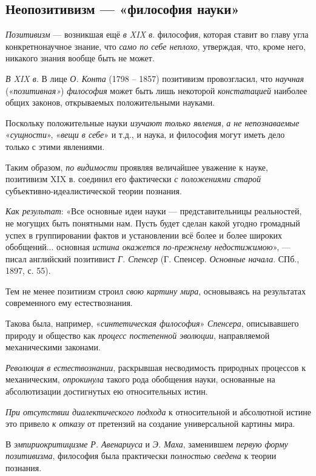 \documentclass[a4paper,14pt,russian]{extreport}
\begin{document}
\subsection{Неопозитивизм --- «философия науки»}

\emph{Позитивизм} --- возникшая ещё \emph{в XIX в}. философия, которая ставит во главу угла конкретнонаучное знание, что \emph{само по себе неплохо}, утверждая, что, кроме него, никакого знания вообще быть не может.

\emph{В XIX в}. В лице \emph{О. Конта} (1798 -- 1857) позитивизм провозгласил, что \emph{научная} («\emph{позитивная»}) \emph{философия} может быть лишь некоторой \emph{констатацией} наиболее общих законов, открываемых положительными науками.

Поскольку положительные науки \emph{изучают} \emph{только явления}, \emph{а не непознаваемые} «\emph{сущности}», «\emph{вещи в себе}» и т.д., и наука, и философия могут иметь дело только с этими явлениями.

Таким образом, \emph{по видимости} проявляя величайшее уважение к науке, позитивизм XIX в. соединил его фактически \emph{с положениями старой} субъективно-идеалистической теории познания.

\emph{Как результат}: «Все основные идеи науки --- представительницы реальностей, не могущих быть понятными нам. Пусть будет сделан какой угодно громадный успех в группировании фактов и установлении всё более и более широких обобщений... основная \emph{истина окажется по-прежнему недостижимою}», --- писал английский позитивист \emph{Г. Спенсер} (Г. Спенсер. \emph{Основные начала}. СПб., 1897, с. 55).

Тем не менее позитиизм строил \emph{свою картину мира}, основываясь на результатах современного ему естествознания.

Такова была, например, «\emph{синтетическая философия}» \emph{Спенсера}, описывавшего природу и общество как \emph{процесс постепенной эволюции}, направляемой механическими законами.

\emph{Революция в естествознании}, раскрывшая несводимость природных процессов к механическим, \emph{опрокинула} такого рода обобщения науки, основанные на абсолютизации достигнутых ею относительных истин.

\emph{При отсутствии диалектического подхода} к относительной и абсолютной истине это привело \emph{к отказу} от претензий на создание универсальной картины мира.

В \emph{эмпириокритицизме} \emph{Р. Авенариуса} и \emph{Э. Маха}, заменившем \emph{первую форму позитивизма}, философия была практически \emph{полностью сведена} к теории познания.
\end{document}

